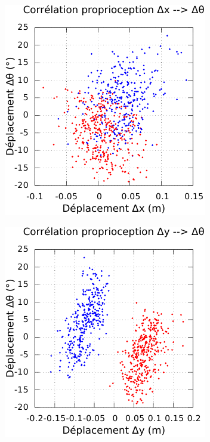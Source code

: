 \begin{figure}[htbp]
\begin{subfigure}{0.22\paperwidth}
    \end{subfigure}
    \vspace{0.2cm}
    \newline
    \begin{subfigure}{0.22\paperwidth}
        \centering
        \includegraphics[type=pdf,ext=.pdf,read=.pdf,width=1.0\linewidth]{../plot/OdometryLWPR/grass_close_function_read_x_yaw}
    \end{subfigure}
    \begin{subfigure}{0.22\paperwidth}
        \centering
        \includegraphics[type=pdf,ext=.pdf,read=.pdf,width=1.0\linewidth]{../plot/OdometryLWPR/grass_close_function_read_y_yaw}

\end{subfigure}
\end{figure}
